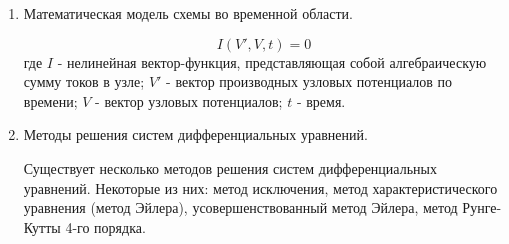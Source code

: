 \documentclass[a4paper,14pt]{article}
\begin{document}
\begin{enumerate}
	\item Математическая модель схемы во временной области.
	 
	\begin{equation}
		I(V', V, t) = 0
	\end{equation}
	где $I$ - нелинейная вектор-функция, представляющая собой 
	алгебраическую сумму токов в узле;
	$V'$ - вектор производных узловых потенциалов по времени;
	$V$ - вектор узловых потенциалов;
	$t$ - время. 
	
	\item Методы решения систем дифференциальных уравнений.
	
	Существует несколько методов решения систем дифференциальных уравнений.
	Некоторые из них: метод исключения, метод характеристического уравнения (метод Эйлера), усовершенствованный метод Эйлера, метод Рунге-Кутты 4-го порядка.
\end{enumerate}
\end{document}
